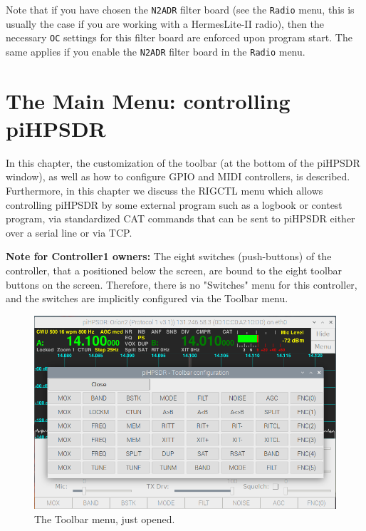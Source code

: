 \documentclass[12pt]{book}
\def\bltt#1{\texttt{\color{blue}#1}}
\begin{document}
Note that if you have chosen the \texttt{N2ADR} filter board (see the \bltt{Radio} menu,
this is usually the
case if you are working with a HermesLite-II radio), then the necessary \bltt{OC}
settings for this filter board are enforced upon program start. The same applies if
you enable the \texttt{N2ADR} filter board in the \bltt{Radio} menu.

\chapter{The Main Menu: controlling piHPSDR}

In this chapter, the customization of the toolbar (at the bottom of the piHPSDR window),
as well as how to configure GPIO and MIDI controllers, is described. Furthermore, in this
chapter we discuss the RIGCTL menu which allows controlling piHPSDR by some external program
such as a logbook or contest program, via standardized CAT commands that can be sent to
piHPSDR either over a serial line or via TCP.

\textbf{Note for Controller1 owners:} The eight switches (push-buttons) of the controller,
that a positioned below the screen, are bound to the eight toolbar buttons on the screen.
Therefore, there is no "Switches" menu for this controller, and the switches are implicitly
configured via the Toolbar menu.

\begin{figure}[ht]
\center
\includegraphics[width=12cm]{ToolbarMenu1.png}
\caption{The Toolbar menu, just opened.}
\label{fig:ToolbarMenu1}
\end{figure}
\end{document}
